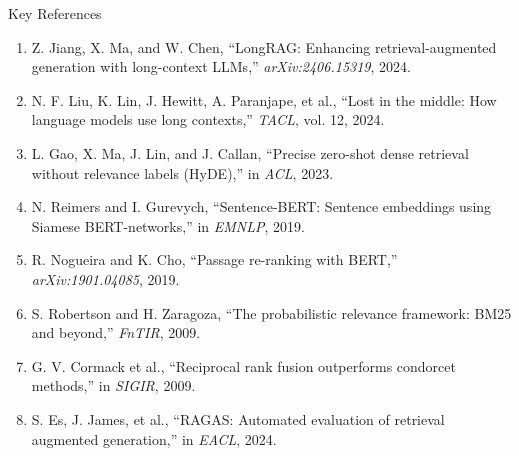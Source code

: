 \documentclass[10pt,aspectratio=169]{beamer}
\begin{document}
\begin{frame}{Key References}
    \scriptsize
    \begin{enumerate}\setlength\itemsep{1.5pt}
        \item Z. Jiang, X. Ma, and W. Chen, ``LongRAG: Enhancing retrieval-augmented generation with long-context LLMs,'' \textit{arXiv:2406.15319}, 2024.
        \item N. F. Liu, K. Lin, J. Hewitt, A. Paranjape, et al., ``Lost in the middle: How language models use long contexts,'' \textit{TACL}, vol. 12, 2024.
        \item L. Gao, X. Ma, J. Lin, and J. Callan, ``Precise zero-shot dense retrieval without relevance labels (HyDE),'' in \textit{ACL}, 2023.
        \item N. Reimers and I. Gurevych, ``Sentence-BERT: Sentence embeddings using Siamese BERT-networks,'' in \textit{EMNLP}, 2019.
        \item R. Nogueira and K. Cho, ``Passage re-ranking with BERT,'' \textit{arXiv:1901.04085}, 2019.
        \item S. Robertson and H. Zaragoza, ``The probabilistic relevance framework: BM25 and beyond,'' \textit{FnTIR}, 2009.
        \item G. V. Cormack et al., ``Reciprocal rank fusion outperforms condorcet methods,'' in \textit{SIGIR}, 2009.
        \item S. Es, J. James, et al., ``RAGAS: Automated evaluation of retrieval augmented generation,'' in \textit{EACL}, 2024.
    \end{enumerate}
\end{frame}
\end{document}
